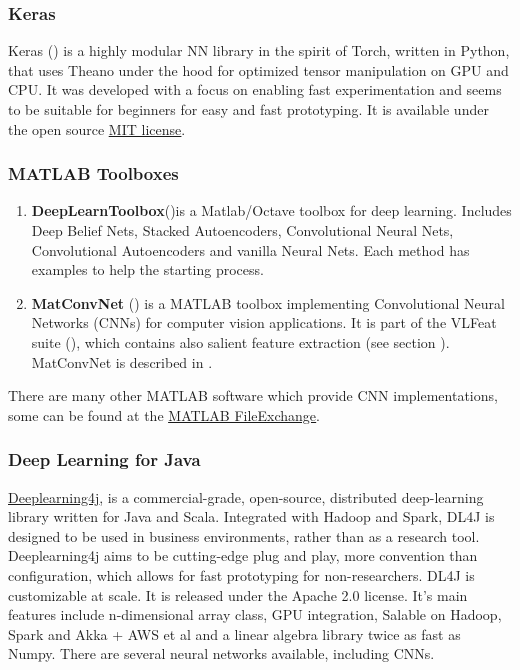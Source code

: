 {\subsubsection{Keras}
Keras (\cite{keras_soft}) is a highly modular NN library in the spirit of Torch, written in Python, that uses Theano under the hood for optimized tensor manipulation on GPU and CPU. It was developed with a focus on enabling fast experimentation and seems to be suitable for beginners for easy and fast prototyping. It is available under the open source \href{http://opensource.org/licenses/MIT}{\underline{MIT license}}. 

\subsubsection{MATLAB Toolboxes}
\begin{enumerate}
\item{{\bf DeepLearnToolbox}(\cite{deeplearntoolbox_soft})is a Matlab/Octave toolbox for deep learning. Includes Deep Belief Nets, Stacked Autoencoders, Convolutional Neural Nets, Convolutional Autoencoders and vanilla Neural Nets. Each method has examples to help the starting process.}
\item{{\bf MatConvNet} (\cite{matconvnet_soft}) is a MATLAB toolbox implementing Convolutional Neural Networks (CNNs) for computer vision applications. It is part of the VLFeat suite (\cite{vlfeat_soft}), which contains also salient feature extraction (see section ). MatConvNet is described in \cite{matconvnet_paper}.}
\end{enumerate}
 There are many other MATLAB software which provide CNN implementations, some can be found at the \href{http://www.mathworks.com/matlabcentral/fileexchange/24291-cnn-convolutional-neural-network-class}{\underline{MATLAB FileExchange}}.

\subsubsection{Deep Learning for Java}
\href{http://deeplearning4j.org/}{\underline{Deeplearning4j}}, \cite{dl4j} is a commercial-grade, open-source, distributed deep-learning library written for Java and Scala. Integrated with Hadoop and Spark, DL4J is designed to be used in business environments, rather than as a research tool. 
Deeplearning4j aims to be cutting-edge plug and play, more convention than configuration, which allows for fast prototyping for non-researchers. DL4J is customizable at scale. It is released under the Apache 2.0 license. It's main features include n-dimensional array class, GPU integration,  Salable on Hadoop, Spark and Akka + AWS et al and a linear algebra library twice as fast as Numpy. There are several neural networks available, including CNNs.


}
